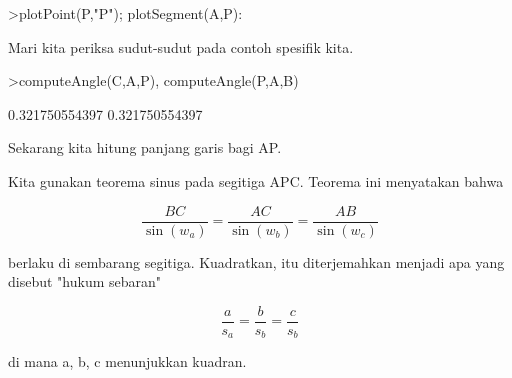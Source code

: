 \documentclass[a4paper,10pt]{article}
\begin{document}
\begin{eulernotebook}
\begin{eulercomment}
\begin{eulercomment}
\begin{eulercomment}
\begin{eulercomment}
\begin{eulercomment}
\begin{eulercomment}
\begin{eulercomment}
\begin{eulercomment}
\begin{eulercomment}
\begin{eulercomment}
\begin{eulercomment}
\begin{eulercomment}
\begin{eulercomment}
\begin{eulercomment}
\begin{eulercomment}
\begin{eulercomment}
\begin{eulercomment}
\begin{eulercomment}
\begin{eulercomment}
\begin{eulercomment}
\begin{eulercomment}
\begin{eulercomment}
\begin{eulercomment}
\begin{eulercomment}
\begin{eulercomment}
\begin{eulercomment}
\begin{eulercomment}
\begin{eulercomment}
\begin{eulercomment}
\begin{eulercomment}
\begin{eulercomment}
\begin{eulercomment}
\begin{eulercomment}
\begin{eulercomment}
\begin{eulercomment}
\begin{eulercomment}
\begin{eulercomment}
\begin{eulercomment}
\begin{eulercomment}
\begin{eulercomment}
\begin{eulerprompt}
>plotPoint(P,"P"); plotSegment(A,P):
\end{eulerprompt}
\begin{eulercomment}
Mari kita periksa sudut-sudut pada contoh spesifik kita.
\end{eulercomment}
\begin{eulerprompt}
>computeAngle(C,A,P), computeAngle(P,A,B)
\end{eulerprompt}
\begin{euleroutput}
  0.321750554397
  0.321750554397
\end{euleroutput}
\begin{eulercomment}
Sekarang kita hitung panjang garis bagi AP.

Kita gunakan teorema sinus pada segitiga APC. Teorema ini menyatakan
bahwa

\end{eulercomment}
\begin{eulerformula}
\[
\frac{BC}{\sin(w_a)} = \frac{AC}{\sin(w_b)} = \frac{AB}{\sin(w_c)}
\]
\end{eulerformula}
\begin{eulercomment}
berlaku di sembarang segitiga. Kuadratkan, itu diterjemahkan menjadi
apa yang disebut "hukum sebaran"

\end{eulercomment}
\begin{eulerformula}
\[
\frac{a}{s_a} = \frac{b}{s_b} = \frac{c}{s_b}
\]
\end{eulerformula}
\begin{eulercomment}
di mana a, b, c menunjukkan kuadran.


\end{eulercomment}
\end{eulercomment}
\end{eulercomment}
\end{eulercomment}
\end{eulercomment}
\end{eulercomment}
\end{eulercomment}
\end{eulercomment}
\end{eulercomment}
\end{eulercomment}
\end{eulercomment}
\end{eulercomment}
\end{eulercomment}
\end{eulercomment}
\end{eulercomment}
\end{eulercomment}
\end{eulercomment}
\end{eulercomment}
\end{eulercomment}
\end{eulercomment}
\end{eulercomment}
\end{eulercomment}
\end{eulercomment}
\end{eulercomment}
\end{eulercomment}
\end{eulercomment}
\end{eulercomment}
\end{eulercomment}
\end{eulercomment}
\end{eulercomment}
\end{eulercomment}
\end{eulercomment}
\end{eulercomment}
\end{eulercomment}
\end{eulercomment}
\end{eulercomment}
\end{eulercomment}
\end{eulercomment}
\end{eulercomment}
\end{eulercomment}
\end{eulercomment}
\end{eulernotebook}
\end{document}
